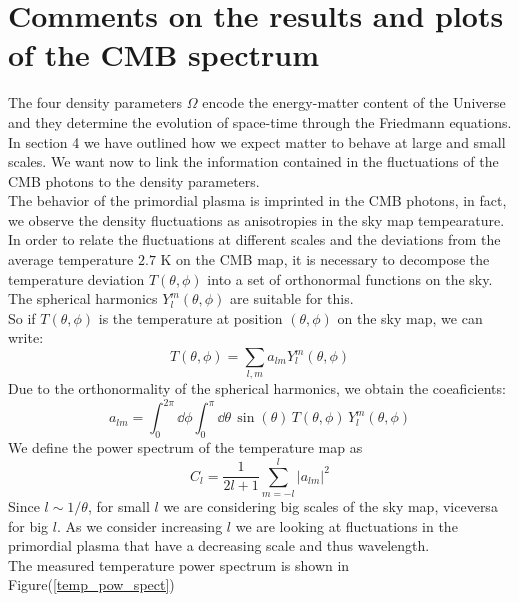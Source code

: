 \documentclass{article}
\begin{document}
\section{Comments on the results and plots of the CMB spectrum}
The four density parameters $\Omega$ encode the energy-matter content of the Universe and they determine the evolution of space-time through the Friedmann equations. 
In section 4 we have outlined how we expect matter to behave at large and small scales.
We want now to link the information contained in the fluctuations of the CMB photons to the density parameters.\\
The behavior of the primordial plasma is imprinted in the CMB photons, in fact, we observe the density fluctuations as anisotropies in the sky map tempearature.
In order to relate the fluctuations at different scales and the deviations from the average temperature $2.7$ K on the CMB map, it is necessary to decompose the temperature deviation $T(\theta, \phi)$ into a set of orthonormal functions on the sky.
The spherical harmonics $Y^{m} _{l} (\theta, \phi)$ are suitable for this.\\
So if $T(\theta,\phi)$ is the temperature at position $(\theta,\phi)$ on the sky map,
we can write:
\begin{equation}
T(\theta, \phi) = \sum _{l, m} a_{lm} Y^{m} _l (\theta, \phi)
\end{equation}
Due to the orthonormality of the spherical harmonics, we obtain the coeaficients:
\begin{equation}
a_{lm} = \int _0 ^{2 \pi} \dd \phi \int _0  ^{\pi} \dd \theta \,
\sin( \theta) \, T(\theta, \phi) \, Y^{m} _l (\theta, \phi)
 \end{equation}
We define the power spectrum of the temperature map as 
 \begin{equation}
 C_l = \dfrac{1}{2l+1} \sum _{m=-l} ^{l} |a_{lm}|^2
 \end{equation}
Since $l \sim 1/ \theta$, for small $l$ we are considering big scales of the sky map, viceversa for big $l$.
As we consider increasing $l$ we are looking at fluctuations in the primordial plasma that have a decreasing  scale and thus wavelength.\\
The measured temperature power spectrum is shown in Figure(\ref{temp_pow_spect})
%
%
%
\end{document}
